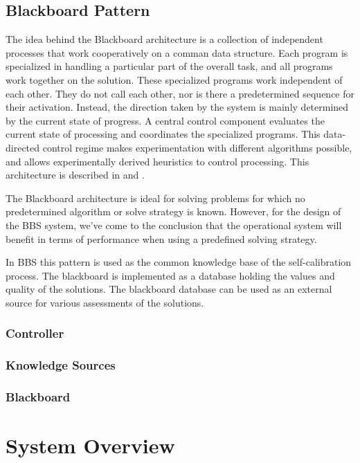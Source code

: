 \documentclass[10pt]{lofar}
\begin{document}
\subsection{Blackboard Pattern}
\label{subsec:blackboard}
The idea behind the Blackboard architecture is a collection of independent processes that work cooperatively on a comman data structure. Each program is specialized in handling a particular part of the overall task, and all programs work together on the solution. These specialized programs work independent of each other. They do not call each other, nor is there a predetermined sequence for their activation. Instead, the direction taken by the system is mainly determined by the current state of progress. A central control component evaluates the current state of processing and coordinates the specialized programs. This data-directed control regime makes experimentation with different algorithms possible, and allows experimentally derived heuristics to control processing. This architecture is described in \cite{Buschmann1996} and \cite{LOFAR-ASTRON-SDD-002}.

The Blackboard architecture is ideal for solving problems for which no predetermined algorithm or solve strategy is known. However, for the design of the BBS system, we've come to the conclusion that the operational system will benefit in terms of performance when using a predefined solving strategy. 

In BBS this pattern is used as the common knowledge base of the self-calibration process. The blackboard is implemented as a database holding the values and quality of the solutions. The blackboard database can be used as an external source for various assessments of the solutions. 
\subsubsection{Controller}
\label{subsubsec:controller}

\subsubsection{Knowledge Sources}
\label{subsubsec:ks}

\subsubsection{Blackboard}
\label{subsubsec:bb}


\pagebreak

\section{System Overview}
\label{sec:overview}
\end{document}
